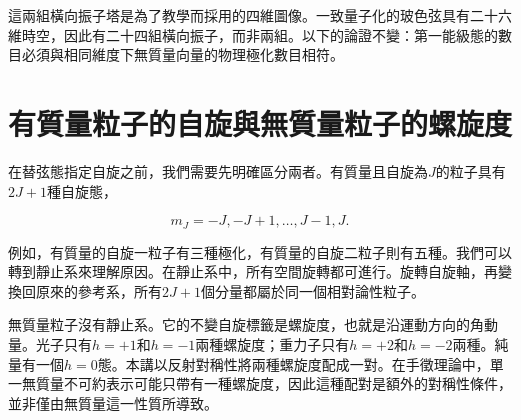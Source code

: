\begin{classroomqa}
\end{classroomqa}

\begin{classroomqa}
\end{classroomqa}

這兩組橫向振子塔是為了教學而採用的四維圖像。一致量子化的玻色弦具有二十六維時空，因此有二十四組橫向振子，而非兩組。以下的論證不變：第一能級態的數目必須與相同維度下無質量向量的物理極化數目相符。

\section{有質量粒子的自旋與無質量粒子的螺旋度}

在替弦態指定自旋之前，我們需要先明確區分兩者。有質量且自旋為\(J\)的粒子具有\(2J+1\)種自旋態，

\begin{equation}
  m_J=-J,-J+1,\ldots,J-1,J.
  \label{eq:l03-massive-spin-multiplet}
\end{equation}

例如，有質量的自旋一粒子有三種極化，有質量的自旋二粒子則有五種。我們可以轉到靜止系來理解原因。在靜止系中，所有空間旋轉都可進行。旋轉自旋軸，再變換回原來的參考系，所有\(2J+1\)個分量都屬於同一個相對論性粒子。

無質量粒子沒有靜止系。它的不變自旋標籤是螺旋度，也就是沿運動方向的角動量。光子只有\(h=+1\)和\(h=-1\)兩種螺旋度；重力子只有\(h=+2\)和\(h=-2\)兩種。純量有一個\(h=0\)態。本講以反射對稱性將兩種螺旋度配成一對。在手徵理論中，單一無質量不可約表示可能只帶有一種螺旋度，因此這種配對是額外的對稱性條件，並非僅由無質量這一性質所導致。

